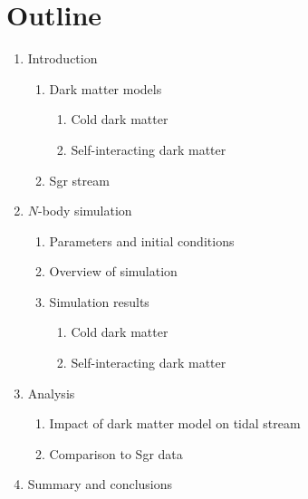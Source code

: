 \documentclass[12pt]{article}
\begin{document}
\section*{Outline}
\begin{enumerate}

\item Introduction
\begin{enumerate}
    \item Dark matter models
    \begin{enumerate}
        \item Cold dark matter
        \item Self-interacting dark matter
    \end{enumerate}

    \item Sgr stream
\end{enumerate}

\item $N$-body simulation
\begin{enumerate}
    \item Parameters and initial conditions
    \item Overview of simulation
    \item Simulation results
    \begin{enumerate}
        \item Cold dark matter
        \item Self-interacting dark matter
    \end{enumerate}
\end{enumerate}

\item Analysis
\begin{enumerate}
    \item Impact of dark matter model on tidal stream
    \item Comparison to Sgr data
\end{enumerate}

\item Summary and conclusions

\end{enumerate}
\end{document}
